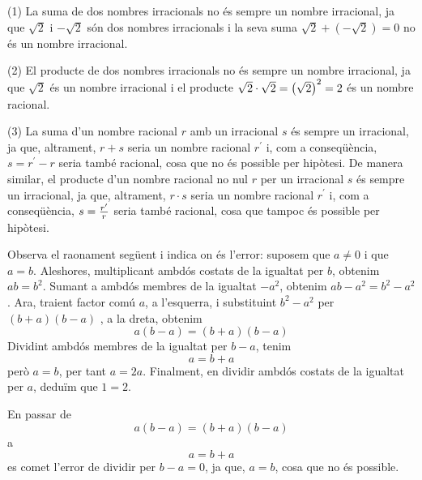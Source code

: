 \begin{solucio}
(1) La suma de dos nombres irracionals no és sempre un nombre
irracional, ja que $\sqrt{2}$ i $-\sqrt{2}$ són dos nombres irracionals i
la seva suma $\sqrt{2}+(-\sqrt{2})=0$ no és un nombre irracional.

(2) El producte de dos nombres irracionals no és sempre un nombre
irracional, ja que $\sqrt{2}$ és un nombre irracional i el producte $\sqrt{%
2}\cdot \sqrt{2}=\left( \sqrt{2}\right) ^{2}=2$ és un nombre
racional.

(3) La suma d’un nombre racional $r$ amb un irracional $s$ és sempre
un irracional, ja que, altrament, $r+s$ seria un nombre
racional $r^{\prime }$ i, com a conseqüència, $s=r^{\prime }-r$ seria
també racional, cosa que no és possible per hipòtesi. De manera
similar, el producte d’un nombre racional no nul $r$ per un irracional 
$s$ és sempre un irracional, ja que, altrament, $r\cdot s$ seria
un nombre racional $r^{\prime }$ i, com a conseqüència, $s=\frac{%
r^{\prime }}{r}$ seria també racional, cosa que tampoc és possible
per hipòtesi.
\end{solucio}

\begin{exercici}
Observa el raonament següent i indica on és l’error:
suposem que $a\neq 0$ i que $a=b$. Aleshores, multiplicant ambdós costats de
la igualtat per $b$, obtenim $ab=b^{2}$. Sumant a ambdós membres de la
igualtat $-a^{2}$, obtenim $ab-a^{2}=b^{2}-a^{2}$. Ara, traient factor
comú $a$, a l’esquerra, i substituint $b^{2}-a^{2}$ per $(b+a)(b-a)$%
, a la dreta, obtenim%
\begin{equation*}
a(b-a)=(b+a)(b-a)
\end{equation*}%
Dividint ambdós membres de la igualtat per $b-a$, tenim%
\begin{equation*}
a=b+a
\end{equation*}%
però $a=b$, per tant $a=2a$. Finalment, en dividir ambdós costats de la igualtat
per $a$, deduïm que $1=2$.

\end{exercici}

\begin{solucio}
En passar de 
\begin{equation*}
a(b-a)=(b+a)(b-a)
\end{equation*}
a 
\begin{equation*}
a=b+a
\end{equation*}
es comet l’error de dividir per $b-a=0$, ja que, $a=b$, cosa que no és possible.
\end{solucio}


